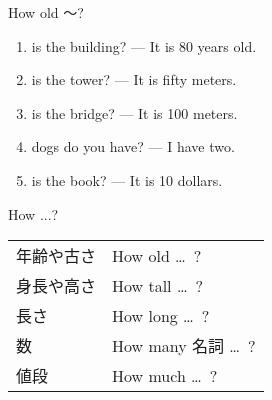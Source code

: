 \documentclass[aspectratio=169,xcolor={dvipsnames,table}]{beamer}
\begin{document}
\begin{frame}[plain]{How old 〜?}
 \begin{enumerate}
  \item {} is the building? --- It is 80 years old.%
\hfill{}
  \item {}is the tower? --- It is fifty meters.%
\hfill{}
  \item {} is the bridge? --- It is 100 meters.
\hfill{}
  \item {} dogs do you have? --- I have two.
\hfill{}
  \item {} is the book? --- It is 10 dollars.
\hfill{}
 \end{enumerate}


\hfill{}

\end{frame}
\begin{frame}[plain]{How ...?}
 
 \begin{center}
\begin{tabular}{ll}\toprule
年齢や古さ& How old \ldots{}\, ?\\
身長や高さ& How tall \ldots{}\, ?\\
長さ&How long \ldots{}\, ?\\
数&How many 名詞 \ldots{}\, ?\\
値段&How much \ldots{}\, ?\\
\bottomrule
\end{tabular}
\end{center}
\end{frame}
\end{document}
